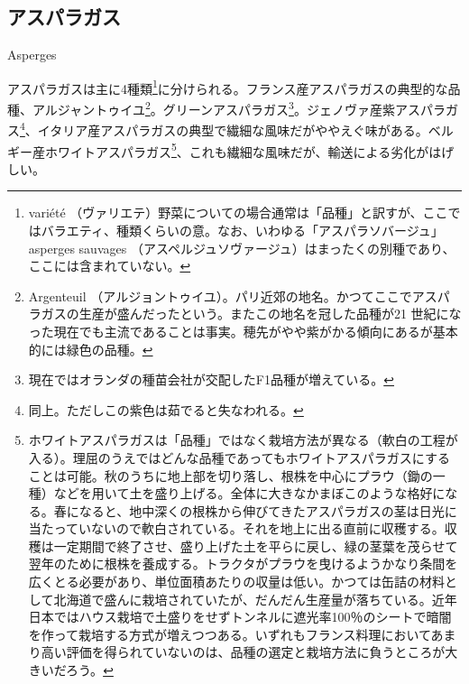 \begin{main}

\hypertarget{asperges}{%
\subsection{アスパラガス}\label{asperges}}

\begin{frsecbenv}

Asperges

\end{frsecbenv}

アスパラガスは主に4種類\footnote{variété
  （ヴァリエテ）野菜についての場合通常は「品種」と訳すが、ここではバラエティ、種類くらいの意。なお、いわゆる「アスパラソバージュ」asperges
  sauvages
  （アスペルジュソヴァージュ）はまったくの別種であり、ここには含まれていない。}に分けられる。フランス産アスパラガスの典型的な品種、アルジャントゥイユ\footnote{Argenteuil
  （アルジョントゥイユ）。パリ近郊の地名。かつてここでアスパラガスの生産が盛んだったという。またこの地名を冠した品種が21
  世紀になった現在でも主流であることは事実。穂先がやや紫がかる傾向にあるが基本的には緑色の品種。}。グリーンアスパラガス\footnote{現在ではオランダの種苗会社が交配したF1品種が増えている。}。ジェノヴァ産紫アスパラガス\footnote{同上。ただしこの紫色は茹でると失なわれる。}、イタリア産アスパラガスの典型で繊細な風味だがややえぐ味がある。ベルギー産ホワイトアスパラガス\footnote{ホワイトアスパラガスは「品種」ではなく栽培方法が異なる（軟白の工程が入る）。理屈のうえではどんな品種であってもホワイトアスパラガスにすることは可能。秋のうちに地上部を切り落し、根株を中心にプラウ（鋤の一種）などを用いて土を盛り上げる。全体に大きなかまぼこのような格好になる。春になると、地中深くの根株から伸びてきたアスパラガスの茎は日光に当たっていないので軟白されている。それを地上に出る直前に収穫する。収穫は一定期間で終了させ、盛り上げた土を平らに戻し、緑の茎葉を茂らせて翌年のために根株を養成する。トラクタがプラウを曳けるようかなり条間を広くとる必要があり、単位面積あたりの収量は低い。かつては缶詰の材料として北海道で盛んに栽培されていたが、だんだん生産量が落ちている。近年日本ではハウス栽培で土盛りをせずトンネルに遮光率100％のシートで暗闇を作って栽培する方式が増えつつある。いずれもフランス料理においてあまり高い評価を得られていないのは、品種の選定と栽培方法に負うところが大きいだろう。}、これも繊細な風味だが、輸送による劣化がはげしい。

\end{main}
